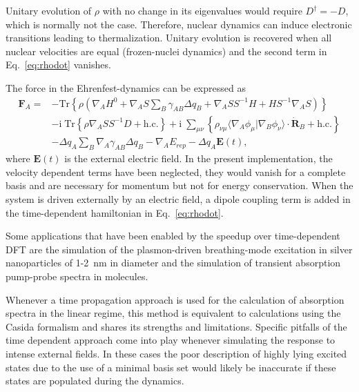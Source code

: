 \documentclass[reprint,onecolumn,superscriptaddress]{revtex4-1}
\begin{document}
Unitary evolution of $\rho$ with no change in its eigenvalues would require
$D^\dagger = -D$, which is normally not the case. Therefore, nuclear dynamics
can induce electronic transitions leading to
thermalization.\cite{Lin2009d} Unitary evolution is recovered when all nuclear
velocities are equal (frozen-nuclei dynamics) and the second term in
Eq.~\ref{eq:rhodot} vanishes.

The force in the Ehrenfest-dynamics can be expressed
as\cite{Todorov:2001ex,Niehaus:2005da}
%
\begin{align}
  \mathbf{F}_A =& -\mathrm{Tr} \left\{ \rho \left( \nabla_A H^0 + \nabla_A S
  \sum_B \gamma_{AB} \Delta q_B + \nabla_A S S^{-1} H + H S^{-1} \nabla_A S
  \right) \right\} \nonumber \\ &- \mathrm{i} \; \mathrm{Tr} \left\{ \rho
  \nabla_A S S^{-1} D + \mathrm{h.c.} \right\} + \mathrm{i} \; \sum_{\mu \nu}
  \left\{ \rho_{\nu \mu} \langle \nabla_A \phi_{\mu} | \nabla_B \phi_{\nu}
  \rangle \cdot \dot{\mathbf{R}}_B + \mathrm{h.c.} \right\} \nonumber \\ &-
  \Delta q_A \sum_{B} \nabla_A \gamma_{AB} \Delta q_B - \nabla_A E_{rep} -
  \Delta q_A \mathbf{E}(t),
  \label{eq:ehrenforces}
\end{align}
where $\mathbf{E}(t)$ is the external electric field. In the present
implementation, the velocity dependent terms have been neglected, they would
vanish for a complete basis \cite{Niehaus:2005da} and are necessary for momentum
but not for energy conservation.\cite{Todorov:2001ex}  When the system is
driven externally by an electric field, a dipole coupling term is added in the
time-dependent hamiltonian in Eq.~\ref{eq:rhodot}.

Some applications that have been enabled by the speedup over time-dependent DFT
are the simulation of the plasmon-driven breathing-mode excitation in silver
nanoparticles of 1-2~nm in diameter \cite{Bonafe2017a} and the simulation of
transient absorption pump-probe spectra in
molecules.\cite{Bonafe2018,Hernandez2019}

Whenever a time propagation approach is used for the calculation of absorption
spectra in the linear regime, this method is equivalent to calculations using
the Casida formalism and shares its strengths and limitations. Specific pitfalls
of the time dependent approach come into play whenever simulating the response
to intense external fields. In these cases the poor description of highly lying
excited states due to the use of a minimal basis set would likely be inaccurate
if these states are populated during the dynamics.
\end{document}
